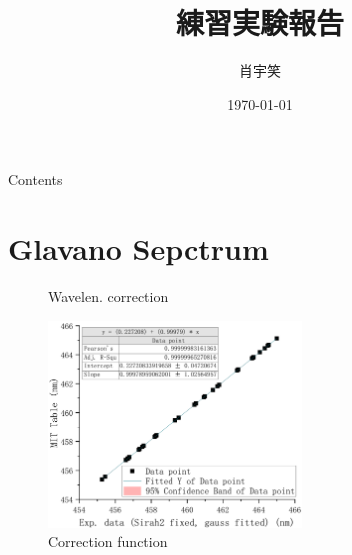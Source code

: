 \documentclass[aspectratio=43,scheme=plain,handout]{ctexbeamer}
\title{練習実験報告}
\author{肖宇笑}
\date{\today}
\begin{document}
%
%
%
%
%
\begin{frame}{Contents}
	\tableofcontents
\end{frame}
%
%
\section{Glavano Sepctrum}	
\begin{frame}{\insertsection}
	\begin{figure}[H]
		\centering
		\caption{Wavelen. correction}
	\end{figure}
\end{frame}
%	
%
\begin{frame}{\insertsection}
	\begin{figure}[H]
		\centering
		\includegraphics[width=0.6\textwidth]{fitfunc.pdf}
		\caption{Correction function}
	\end{figure}
\end{frame}
%	
%
\end{document}
